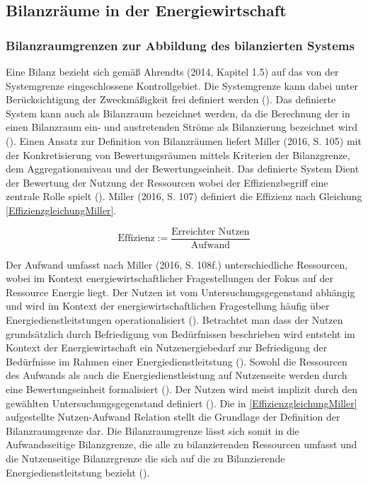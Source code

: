 \subsection{Bilanzräume in der Energiewirtschaft}


\subsubsection{Bilanzraumgrenzen zur Abbildung des bilanzierten Systems}
Eine Bilanz bezieht sich gemäß Ahrendts (2014, Kapitel 1.5) auf das von der Systemgrenze eingeschlossene Kontrollgebiet. 
Die Systemgrenze kann dabei unter Berücksichtigung der Zweckmäßigkeit frei definiert werden (\cite[Kapitel 1.5]{Ahrendts.2014}).
Das definierte System kann auch als Bilanzraum bezeichnet werden, da die Berechnung der in einen Bilanzraum ein- und austretenden Ströme als Bilanzierung bezeichnet wird (\cite[S. 65]{Rönsch.2015}).
Einen Ansatz zur Definition von Bilanzräumen liefert Miller (2016, S. 105) mit der Konkretisierung von Bewertungsräumen mittels Kriterien der Bilanzgrenze, dem 
Aggregationsniveau und der Bewertungseinheit. Das definierte System Dient der Bewertung der Nutzung der Ressourcen wobei der Effizienzbegriff eine zentrale Rolle spielt (\cite[S. 107]{Miller.2016}).
Miller (2016, S. 107) definiert die Effizienz nach Gleichung \eqref{EffizienzgleichungMiller}.

\begin{equation}
    \text{Effizienz} := \frac{\text{Erreichter Nutzen}}{\text{Aufwand}}
    \label{EffizienzgleichungMiller}
\end{equation}

Der Aufwand umfasst nach Miller (2016, S. 108f.) unterschiedliche Ressourcen, wobei im Kontext energiewirtschaftlicher Fragestellungen der Fokus auf der Ressource Energie 
liegt.
Der Nutzen ist vom Untersuchungsgegenstand abhängig und wird im Kontext der energiewirtschaftlichen 
Fragestellung häufig über Energiedienstleitstungen operationalisiert (\cite[S. 107]{Miller.2016}). Betrachtet man dass der Nutzen grundsätzlich durch Befriedigung 
von Bedürfnissen beschrieben wird entsteht im Kontext der Energiewirtschaft ein Nutzenergiebedarf zur Befriedigung der Bedürfnisse im Rahmen einer Energiedienstleitstung 
(\cite[S. 107]{Miller.2016}). 
Sowohl die Ressourcen des Aufwands als auch die Energiedienstleistung auf Nutzenseite werden durch eine Bewertungseinheit formalisiert (\cite{Miller.2016}).
Der Nutzen wird meist implizit durch den gewählten Untersuchungsgegenstand definiert (\cite[S. 110]{Miller.2016}).
Die in \eqref{EffizienzgleichungMiller} aufgestellte Nutzen-Aufwand Relation stellt die Grundlage der Definition der Bilanzraumgrenze dar. 
Die Bilanzraumgrenze lässt sich somit in die Aufwandsseitige Bilanzgrenze, die alle zu bilanzierenden Ressourcen umfasst und die Nutzenseitige Bilanzrgrenze die sich auf 
die zu Bilanzierende Energiedienstleitstung bezieht (\cite[S. 111]{Miller.2016}).  

